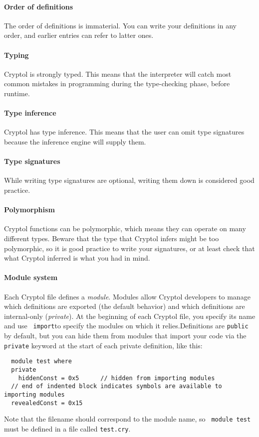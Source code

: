 \paragraph*{Order of definitions}
The order of definitions is immaterial. You can write your definitions
in any order, and earlier entries can refer to latter ones.

\paragraph*{Typing}
Cryptol is strongly typed. This means that the interpreter will catch
most common mistakes in programming during the type-checking phase,
before runtime.

\paragraph*{Type inference}
Cryptol has type inference. This means that the user can omit type
signatures because the inference engine will supply
them.\indTypeInference

\paragraph*{Type signatures}
While writing type signatures are optional, writing them down is
considered good practice.\indSignature

\paragraph*{Polymorphism}
Cryptol functions can be polymorphic, which means they can operate on
many different types.  Beware that the type that Cryptol infers might
be too polymorphic, so it is good practice to write your signatures,
or at least check that what Cryptol inferred is what you had in
mind.\indPolymorphism\indSignature

\paragraph*{Module system} 
Each Cryptol file defines a {\it module}. Modules allow Cryptol
developers to manage which definitions are exported (the default
behavior) and which definitions are internal-only ({\it private}). At
the beginning of each Cryptol file, you specify its name and use {\tt
  import}\indImport to specify the modules on which it
relies.\indModuleSystem  Definitions are {\tt public} by default, but
you can hide them from modules that import your code via the {\tt
  private} keyword at the start of each private definition,\indPrivate
like this:
\begin{Verbatim}
  module test where
  private
    hiddenConst = 0x5      // hidden from importing modules
  // end of indented block indicates symbols are available to importing modules
  revealedConst = 0x15
\end{Verbatim}
Note that the filename should correspond to the module name, so {\tt
  module test} must be defined in a file called {\tt test.cry}.


